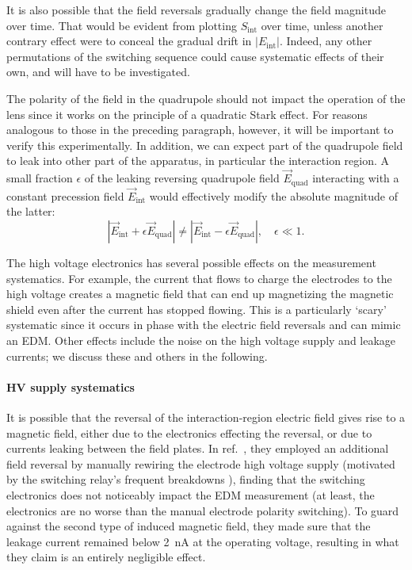 It is also possible that the field reversals gradually change the field
magnitude over time. That would be evident from plotting $S_\text{int}$ over
time, unless another contrary effect were to conceal the gradual drift in
$|E_\text{int}|$. Indeed, any other permutations of the switching sequence could
cause systematic effects of their own, and will have to be investigated.

The polarity of the field in the quadrupole should not impact the operation of
the lens since it works on the principle of a quadratic Stark effect. For
reasons analogous to those in the preceding paragraph, however, it will be
important to verify this experimentally. In addition, we can expect part of the
quadrupole field to leak into other part of the apparatus, in particular the
interaction region. A small fraction $\epsilon$ of the leaking reversing
quadrupole field $\vec E_\text{quad}$ interacting with a constant precession
field $\vec E_\text{int}$ would effectively modify the absolute magnitude of the
latter:
%
\[
|\vec E_\text{int} + \epsilon\vec E_\text{quad}|
\ne
|\vec E_\text{int} - \epsilon\vec E_\text{quad}|,
\quad
\epsilon\ll1.
\]

The high voltage electronics has several possible effects on the measurement
systematics. For example, the current that flows to charge the electrodes to the
high voltage creates a magnetic field that can end up magnetizing the magnetic
shield even after the current has stopped flowing. This is a particularly
`scary' systematic since it occurs in phase with the electric field reversals
and can mimic an \gls{EDM}. Other effects include the noise on the high voltage
supply and leakage currents; we discuss these and others in the following.

\paragraph{HV supply systematics}

It is possible that the reversal of the interaction-region electric field gives
rise to a magnetic field, either due to the electronics effecting the reversal,
or due to currents leaking between the field plates. In
ref.~\cite{cho1991search}, they employed an additional field reversal by
manually rewiring the electrode high voltage supply (motivated by the switching
relay's frequent breakdowns \cite{cho1990thesis}), finding that the switching
electronics does not noticeably impact the \gls{EDM} measurement (at least, the
electronics are no worse than the manual electrode polarity switching). To guard
against the second type of induced magnetic field, they made sure that the
leakage current remained below 2~nA at the operating voltage, resulting in what
they claim is an entirely negligible effect.

